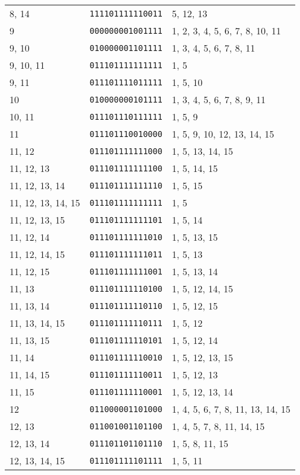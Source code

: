 \documentclass[a4paper,12pt]{article}
\begin{document}
\begin{longtable}{l|l|l}
        8, 14&\texttt{111101111110011}&5, 12, 13\\
        9&\texttt{000000001001111}&1, 2, 3, 4, 5, 6, 7, 8, 10, 11\\
        9, 10&\texttt{010000001101111}&1, 3, 4, 5, 6, 7, 8, 11\\
        9, 10, 11&\texttt{011101111111111}&1, 5\\
        9, 11&\texttt{011101111011111}&1, 5, 10\\
        10&\texttt{010000000101111}&1, 3, 4, 5, 6, 7, 8, 9, 11\\
        10, 11&\texttt{011101110111111}&1, 5, 9\\
        11&\texttt{011101110010000}&1, 5, 9, 10, 12, 13, 14, 15\\
        11, 12&\texttt{011101111111000}&1, 5, 13, 14, 15\\
        11, 12, 13&\texttt{011101111111100}&1, 5, 14, 15\\
        11, 12, 13, 14&\texttt{011101111111110}&1, 5, 15\\
        11, 12, 13, 14, 15&\texttt{011101111111111}&1, 5\\
        11, 12, 13, 15&\texttt{011101111111101}&1, 5, 14\\
        11, 12, 14&\texttt{011101111111010}&1, 5, 13, 15\\
        11, 12, 14, 15&\texttt{011101111111011}&1, 5, 13\\
        11, 12, 15&\texttt{011101111111001}&1, 5, 13, 14\\
        11, 13&\texttt{011101111110100}&1, 5, 12, 14, 15\\
        11, 13, 14&\texttt{011101111110110}&1, 5, 12, 15\\
        11, 13, 14, 15&\texttt{011101111110111}&1, 5, 12\\
        11, 13, 15&\texttt{011101111110101}&1, 5, 12, 14\\
        11, 14&\texttt{011101111110010}&1, 5, 12, 13, 15\\
        11, 14, 15&\texttt{011101111110011}&1, 5, 12, 13\\
        11, 15&\texttt{011101111110001}&1, 5, 12, 13, 14\\
        12&\texttt{011000001101000}&1, 4, 5, 6, 7, 8, 11, 13, 14, 15\\
        12, 13&\texttt{011001001101100}&1, 4, 5, 7, 8, 11, 14, 15\\
        12, 13, 14&\texttt{011101101101110}&1, 5, 8, 11, 15\\
        12, 13, 14, 15&\texttt{011101111101111}&1, 5, 11\\

\end{longtable}
\end{document}
